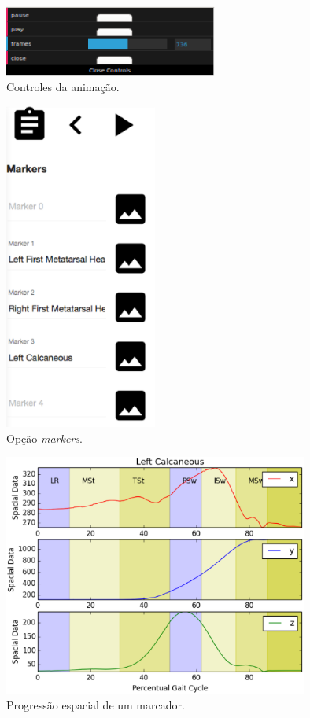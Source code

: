 \begin{figure}[ht]
	\centering
	\includegraphics[width=7cm]{figuras/tela17.eps}
	\caption{Controles da animação.}
	\label{animacao5}
\end{figure}



\begin{figure}[ht]
	\centering
	\includegraphics[width=5cm]{figuras/tela18.eps}
	\caption{Opção \emph{markers}.}
	\label{tela18}
\end{figure}


\begin{figure}[ht]
	\centering
	\includegraphics[width=10cm]{figuras/tela19.eps}
	\caption{Progressão espacial de um marcador.}
	\label{tela19}
\end{figure}

